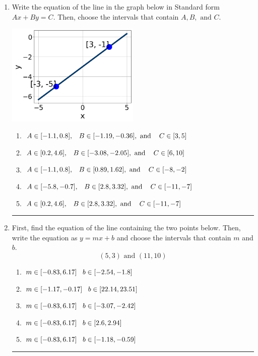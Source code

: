 \documentclass[14pt]{extbook}
\newcommand{\litem}[1]{\item#1\hspace*{-1cm}\rule{\textwidth}{0.4pt}}
\begin{document}
\begin{enumerate}
{\begin{enumerate}[label=\Alph*.]
\end{enumerate} }
\litem{
Write the equation of the line in the graph below in Standard form $Ax+By=C$. Then, choose the intervals that contain $A, B, \text{ and } C$.
\begin{center}
    \includegraphics[width=0.5\textwidth]{../Figures/linearGraphToStandardB.png}
\end{center}
\begin{enumerate}[label=\Alph*.]
\item \( A \in [-1.1, 0.8], \hspace{3mm} B \in [-1.19, -0.36], \text{ and } \hspace{3mm} C \in [3, 5] \)
\item \( A \in [0.2, 4.6], \hspace{3mm} B \in [-3.08, -2.05], \text{ and } \hspace{3mm} C \in [6, 10] \)
\item \( A \in [-1.1, 0.8], \hspace{3mm} B \in [0.89, 1.62], \text{ and } \hspace{3mm} C \in [-8, -2] \)
\item \( A \in [-5.8, -0.7], \hspace{3mm} B \in [2.8, 3.32], \text{ and } \hspace{3mm} C \in [-11, -7] \)
\item \( A \in [0.2, 4.6], \hspace{3mm} B \in [2.8, 3.32], \text{ and } \hspace{3mm} C \in [-11, -7] \)

\end{enumerate} }
\litem{
First, find the equation of the line containing the two points below. Then, write the equation as $ y=mx+b $ and choose the intervals that contain $m$ and $b$.\[ (5, 3) \text{ and } (11, 10) \]\begin{enumerate}[label=\Alph*.]
\item \( m \in [-0.83, 6.17] \hspace*{3mm} b \in [-2.54, -1.8] \)
\item \( m \in [-1.17, -0.17] \hspace*{3mm} b \in [22.14, 23.51] \)
\item \( m \in [-0.83, 6.17] \hspace*{3mm} b \in [-3.07, -2.42] \)
\item \( m \in [-0.83, 6.17] \hspace*{3mm} b \in [2.6, 2.94] \)
\item \( m \in [-0.83, 6.17] \hspace*{3mm} b \in [-1.18, -0.59] \)


\end{enumerate}}
\end{enumerate}
\end{document}
